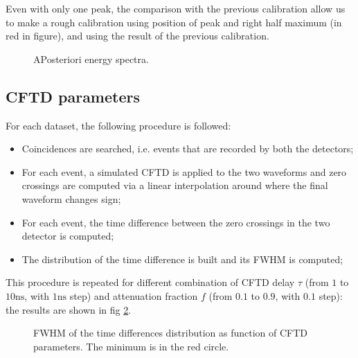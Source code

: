 \documentclass[11pt,a4 paper]{article}
\begin{document}
Even with only one peak, the comparison with the previous calibration allow us to make a rough calibration using position of peak and right half maximum (in red in figure), and using the result of the previous calibration.

\begin{figure}[H]
    \centering
    \caption{APosteriori energy spectra.}
    \label{fig:aposteriori_energy}
\end{figure}

\subsection{CFTD parameters}
For each dataset, the following procedure is followed:
\begin{itemize}[noitemsep]
    \item Coincidences are searched, i.e. events that are recorded by both the detectors;
    \item For each event, a simulated CFTD is applied to the two waveforms and zero crossings are computed via a linear interpolation around where the final waveform changes sign;
    \item For each event, the time difference between the zero crossings in the two detector is computed;
    \item The distribution of the time difference is built and its FWHM is computed;
\end{itemize}
This procedure is repeated for different combination of CFTD delay $\tau$ (from $1$ to $10\si{\nano\second}$, with $1\si{\nano\second}$ step) and attenuation fraction $f$ (from $0.1$ to $0.9$, with $0.1$ step): the results are shown in fig \ref{fig:FWHM2D:sim}.



\begin{figure}[H]
    \centering
    \caption{FWHM of the time differences distribution as function of CFTD parameters. The minimum is in the red circle.}
    \label{fig:FWHM2D:sim}
\end{figure}
\end{document}
